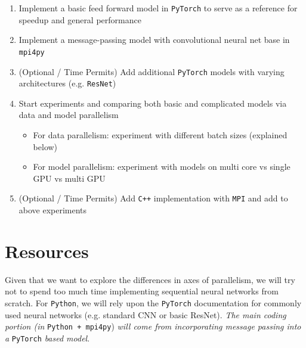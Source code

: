 \documentclass{article}
\begin{document}
\begin{enumerate}
  \item Implement a basic feed forward model in \texttt{PyTorch} to serve as a reference for speedup and general performance
  \item Implement a message-passing model with convolutional neural net base in \texttt{mpi4py}
  \item (Optional / Time Permits) Add additional \texttt{PyTorch} models with varying architectures (e.g. \texttt{ResNet})
  \item Start experiments and comparing both basic and complicated models via data and model parallelism
  \begin{itemize}
    \item For data parallelism: experiment with different batch sizes (explained below)
    \item For model parallelism: experiment with models on multi core vs single GPU vs multi GPU
  \end{itemize}
  \item (Optional / Time Permits) Add \texttt{C++} implementation with \texttt{MPI} and add to above experiments
\end{enumerate}

\section*{Resources}


Given that we want to explore the differences in axes of parallelism, we will try not to spend too much time implementing sequential neural networks from scratch. For \texttt{Python}, we will rely upon the \texttt{PyTorch} documentation for commonly used neural networks (e.g. standard CNN or basic ResNet). \textit{The main coding portion (in} \texttt{Python + mpi4py}) \textit{will come from incorporating message passing into a} \texttt{PyTorch} \textit{based model}. \\
\end{document}
